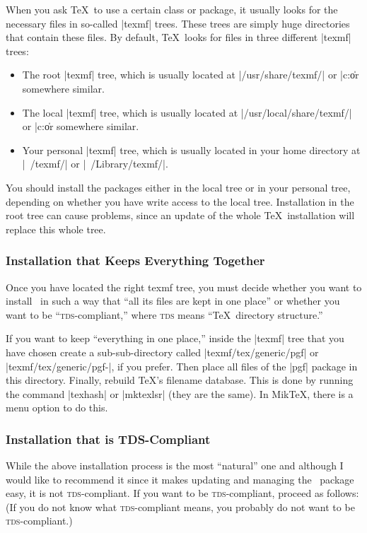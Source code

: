 When you ask \TeX\ to use a certain class or package, it usually looks
for the necessary files in so-called |texmf| trees. These trees
are simply huge directories that contain these files. By default,
\TeX\ looks for files in three different |texmf| trees:
\begin{itemize}
\item
  The root |texmf| tree, which is usually located at
  |/usr/share/texmf/| or |c:\texmf\| or somewhere similar.
\item
  The local  |texmf| tree, which is usually located at
  |/usr/local/share/texmf/| or |c:\localtexmf\| or somewhere similar.
\item
  Your personal  |texmf| tree, which is usually located in your home
  directory at |~/texmf/| or |~/Library/texmf/|.   
\end{itemize}

You should install the packages either in the local tree or in
your personal tree, depending on whether you have write access to the
local tree. Installation in the root tree can cause problems, since an
update of the whole \TeX\ installation will replace this whole tree.


\subsubsection{Installation that Keeps Everything Together}

Once you have located the right texmf tree, you must decide whether
you want to install \pgfname\ in such a way that ``all its files are
kept in one place'' or whether you want to be
``\textsc{tds}-compliant,'' where \textsc{tds} means ``\TeX\ directory
structure.''

If you want to keep ``everything in one place,'' inside the |texmf|
tree that you have chosen create a sub-sub-directory called
|texmf/tex/generic/pgf| or
|texmf/tex/generic/pgf-|\texttt{\pgfversion}, if you prefer. Then
place all files of the |pgf| package in this directory. Finally,
rebuild \TeX's filename database. This is done by running the command
|texhash| or |mktexlsr| (they are the same). In Mik\TeX, there is a
menu option to do this. 


\subsubsection{Installation that is TDS-Compliant}

While the above installation process is the most ``natural'' one and
although I would like to recommend it since it makes updating and
managing the \pgfname\ package easy, it is not
\textsc{tds}-compliant. If you want to be \textsc{tds}-compliant,
proceed as follows: (If you do not know what \textsc{tds}-compliant
means, you probably do not want to be \textsc{tds}-compliant.)

